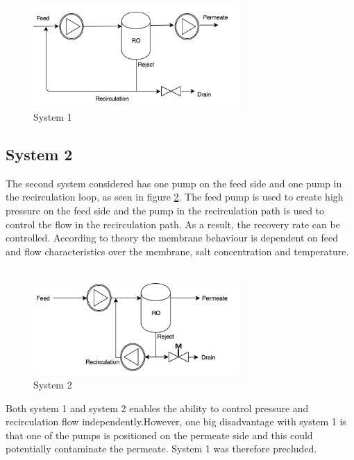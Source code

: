 \begin{figure}[H]
    \centering
    \includegraphics[width=0.7\textwidth]{FlowCInves1}
    \caption{System 1}
    \label{fig:FlowCInves1}
\end{figure}

\subsection{System 2}
The second system considered has one pump on the feed side and one pump in the recirculation loop, as seen in figure \ref{fig:Sys2}. The feed pump is used to create high pressure on the feed side and the pump in the recirculation path is used to control the flow in the recirculation path. As a result, the recovery rate can be controlled. According to theory the membrane behaviour is dependent on feed and flow characteristics over the membrane, salt concentration and temperature. \\
\\
\begin{figure}[H]
    \centering
    \includegraphics[width=0.7\textwidth]{Sys2}
    \caption{System 2}
    \label{fig:Sys2}
\end{figure}
Both system 1 and system 2 enables the ability to control pressure and recirculation flow independently.However, one big disadvantage with system 1 is that one of the pumps is positioned on the  permeate side and this could potentially contaminate the permeate. System 1 was therefore precluded.


